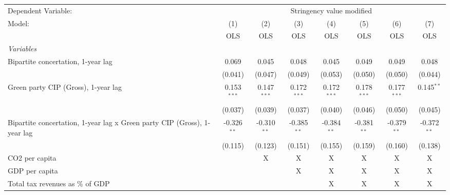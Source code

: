 
\begingroup
\centering
\begin{tabular}{lccccccc}
   \toprule
   Dependent Variable: & \multicolumn{7}{c}{Stringency value modified}\\
   Model:                                                                   & (1)           & (2)           & (3)           & (4)           & (5)           & (6)           & (7)\\  
                                                                            &  OLS          & OLS           & OLS           & OLS           & OLS           & OLS           & OLS\\  
   \midrule
   \emph{Variables}\\
   Bipartite concertation, 1-year lag                                       & 0.069         & 0.045         & 0.048         & 0.045         & 0.049         & 0.049         & 0.048\\   
                                                                            & (0.041)       & (0.047)       & (0.049)       & (0.053)       & (0.050)       & (0.050)       & (0.044)\\   
   Green party CIP (Gross), 1-year lag                                      & 0.153$^{***}$ & 0.147$^{***}$ & 0.172$^{***}$ & 0.172$^{***}$ & 0.178$^{***}$ & 0.177$^{***}$ & 0.145$^{**}$\\   
                                                                            & (0.037)       & (0.039)       & (0.037)       & (0.040)       & (0.046)       & (0.050)       & (0.045)\\   
   Bipartite concertation, 1-year lag x Green party CIP (Gross), 1-year lag & -0.326$^{**}$ & -0.310$^{**}$ & -0.385$^{**}$ & -0.384$^{**}$ & -0.381$^{**}$ & -0.379$^{**}$ & -0.372$^{**}$\\   
                                                                            & (0.115)       & (0.123)       & (0.151)       & (0.155)       & (0.159)       & (0.160)       & (0.138)\\   
   CO2 per capita                                                           &               & X             & X             & X             & X             & X             & X\\  
   GDP per capita                                                           &               &               & X             & X             & X             & X             & X\\  
   Total tax revenues as \% of GDP                                          &               &               &               & X             & X             & X             & X\\  

\end{tabular}
